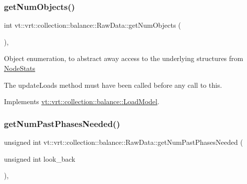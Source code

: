 \mbox{\label{structvt_1_1vrt_1_1collection_1_1balance_1_1_raw_data_a586c3223d1f69ee9d5eb2930ff659051}} 
\subsubsection{\texorpdfstring{get\+Num\+Objects()}{getNumObjects()}}
{\footnotesize\ttfamily int vt\+::vrt\+::collection\+::balance\+::\+Raw\+Data\+::get\+Num\+Objects (\begin{DoxyParamCaption}{ }\end{DoxyParamCaption})\hspace{0.3cm}{\ttfamily [override]}, {\ttfamily [virtual]}}

Object enumeration, to abstract away access to the underlying structures from \hyperlink{structvt_1_1vrt_1_1collection_1_1balance_1_1_node_stats}{Node\+Stats}

The {\ttfamily update\+Loads} method must have been called before any call to this. 

Implements \hyperlink{classvt_1_1vrt_1_1collection_1_1balance_1_1_load_model_a87b90c2daf3a34243a7a2af266aa0b29}{vt\+::vrt\+::collection\+::balance\+::\+Load\+Model}.

\mbox{\label{structvt_1_1vrt_1_1collection_1_1balance_1_1_raw_data_a8f709c3aeaf10e92c746d773d7ba6f9c}} 
\subsubsection{\texorpdfstring{get\+Num\+Past\+Phases\+Needed()}{getNumPastPhasesNeeded()}}
{\footnotesize\ttfamily unsigned int vt\+::vrt\+::collection\+::balance\+::\+Raw\+Data\+::get\+Num\+Past\+Phases\+Needed (\begin{DoxyParamCaption}\item[{unsigned int}]{look\+\_\+back }\end{DoxyParamCaption})\hspace{0.3cm}{\ttfamily [override]}, {\ttfamily [virtual]}}



